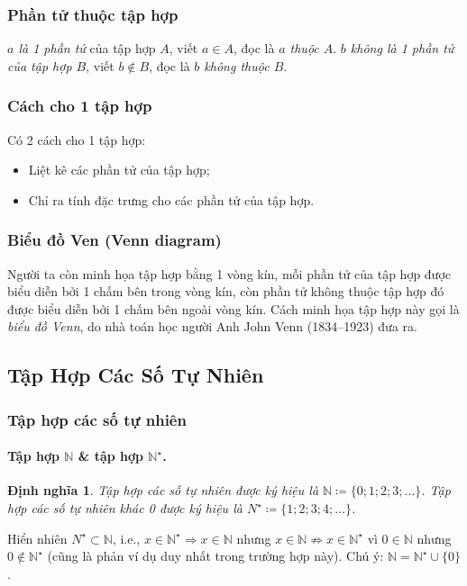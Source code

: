 \documentclass{article}
\numberwithin{equation}{section}
\newtheorem{definition}{Định nghĩa}[section]
\begin{document}
\subsubsection{Phần tử thuộc tập hợp}
\textit{$a$ là 1 phần tử} của tập hợp $A$, viết $a\in A$, đọc là \textit{$a$ thuộc $A$}. \textit{$b$ không là 1 phần tử của tập hợp $B$}, viết $b\notin B$, đọc là \textit{$b$ không thuộc $B$}.

\subsubsection{Cách cho 1 tập hợp}
Có 2 cách cho 1 tập hợp:
\begin{itemize}
	\item Liệt kê các phần tử của tập hợp;
	\item Chỉ ra tính đặc trưng cho các phần tử của tập hợp.
\end{itemize}

\subsubsection{Biểu đồ Ven (Venn diagram)}
Người ta còn minh họa tập hợp bằng 1 vòng kín, mỗi phần tử của tập hợp được biểu diễn bởi 1 chấm bên trong vòng kín, còn phần tử không thuộc tập hợp đó được biểu diễn bởi 1 chấm bên ngoài vòng kín. Cách minh họa tập hợp này gọi là \textit{biểu đồ Venn}, do nhà toán học người Anh John Venn (1834--1923) đưa ra.

\subsection{Tập Hợp Các Số Tự Nhiên}

\subsubsection{Tập hợp các số tự nhiên}

\paragraph{Tập hợp $\mathbb{N}$ \& tập hợp $\mathbb{N}^\star$.}
\begin{definition}
	\emph{Tập hợp các số tự nhiên} được ký hiệu là $\mathbb{N}\coloneqq\{0;1;2;3;\ldots\}$. \emph{Tập hợp các số tự nhiên khác 0} được ký hiệu là $N^\star\coloneqq\{1;2;3;4;\ldots\}$.
\end{definition}
Hiển nhiên $N^\star\subset\mathbb{N}$, i.e., $x\in\mathbb{N}^\star\Rightarrow x\in\mathbb{N}$ nhưng $x\in\mathbb{N}\not\Rightarrow x\in\mathbb{N}^\star$ vì $0\in\mathbb{N}$ nhưng $0\notin\mathbb{N}^\star$ (cũng là phản ví dụ duy nhất trong trường hợp này). Chú ý: $\mathbb{N} = \mathbb{N}^\star\cup\{0\}$.
\end{document}
